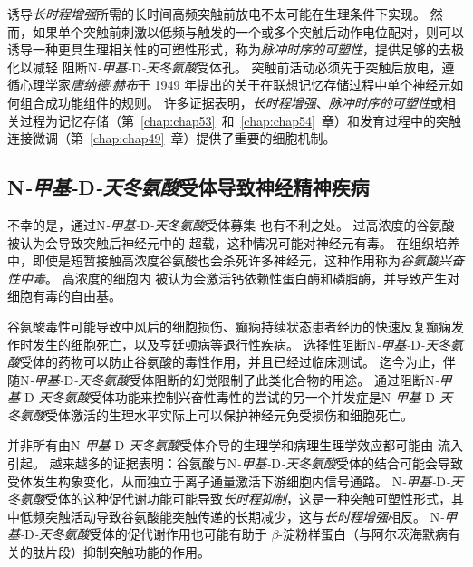 诱导\textit{长时程增强}所需的长时间高频突触前放电不太可能在生理条件下实现。
然而，如果单个突触前刺激以低频与触发的一个或多个突触后动作电位配对，则可以诱导一种更具生理相关性的可塑性形式，称为\textit{脉冲时序的可塑性}，提供足够的去极化以减轻  阻断N\textit{-甲基-}D\textit{-天冬氨酸}受体孔。
突触前活动必须先于突触后放电，遵循心理学家\textit{唐纳德$\cdot$赫布}于 1949 年提出的关于在联想记忆存储过程中单个神经元如何组合成功能组件的规则。
许多证据表明，\textit{长时程增强}、\textit{脉冲时序的可塑性}或相关过程为记忆存储（第~\ref{chap:chap53}~和~\ref{chap:chap54}~章）和发育过程中的突触连接微调（第~\ref{chap:chap49}~章）提供了重要的细胞机制。



\subsection{N\textit{-甲基-}D\textit{-天冬氨酸}受体导致神经精神疾病}

不幸的是，通过N\textit{-甲基-}D\textit{-天冬氨酸}受体募集  也有不利之处。
过高浓度的谷氨酸被认为会导致突触后神经元中的  超载，这种情况可能对神经元有毒。
在组织培养中，即使是短暂接触高浓度谷氨酸也会杀死许多神经元，这种作用称为\textit{谷氨酸兴奋性中毒}。
高浓度的细胞内  被认为会激活钙依赖性蛋白酶和磷脂酶，并导致产生对细胞有毒的自由基。


谷氨酸毒性可能导致中风后的细胞损伤、癫痫持续状态患者经历的快速反复癫痫发作时发生的细胞死亡，以及亨廷顿病等退行性疾病。
选择性阻断N\textit{-甲基-}D\textit{-天冬氨酸}受体的药物可以防止谷氨酸的毒性作用，并且已经过临床测试。
迄今为止，伴随N\textit{-甲基-}D\textit{-天冬氨酸}受体阻断的幻觉限制了此类化合物的用途。
通过阻断N\textit{-甲基-}D\textit{-天冬氨酸}受体功能来控制兴奋性毒性的尝试的另一个并发症是N\textit{-甲基-}D\textit{-天冬氨酸}受体激活的生理水平实际上可以保护神经元免受损伤和细胞死亡。


并非所有由N\textit{-甲基-}D\textit{-天冬氨酸}受体介导的生理学和病理生理学效应都可能由  流入引起。
越来越多的证据表明：谷氨酸与N\textit{-甲基-}D\textit{-天冬氨酸}受体的结合可能会导致受体发生构象变化，从而独立于离子通量激活下游细胞内信号通路。 
N\textit{-甲基-}D\textit{-天冬氨酸}受体的这种促代谢功能可能导致\textit{长时程抑制}，这是一种突触可塑性形式，其中低频突触活动导致谷氨酸能突触传递的长期减少，这与\textit{长时程增强}相反。
N\textit{-甲基-}D\textit{-天冬氨酸}受体的促代谢作用也可能有助于 $\beta$-淀粉样蛋白（与阿尔茨海默病有关的肽片段）抑制突触功能的作用。


